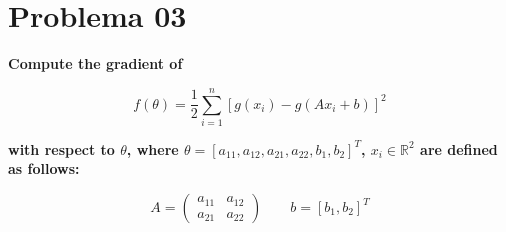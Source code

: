 \section*{Problema 03}

\textbf{Compute the gradient of}

\begin{equation*}
    f(\theta) = \frac{1}{2} \sum_{i=1}^n [g(x_i)-g(Ax_i+b)]^2
\end{equation*}

\textbf{with respect to $\theta$, where $\theta=[a_{11},a_{12},a_{21},a_{22},b_1,b_2]^T$, $x_i \in \mathbb{R}^2$ are defined as follows:}

\begin{equation*}
    A = \begin{pmatrix}
        a_{11} & a_{12} \\
        a_{21} & a_{22}
    \end{pmatrix} \qquad
    b= [b_1,b_2]^T
\end{equation*}
